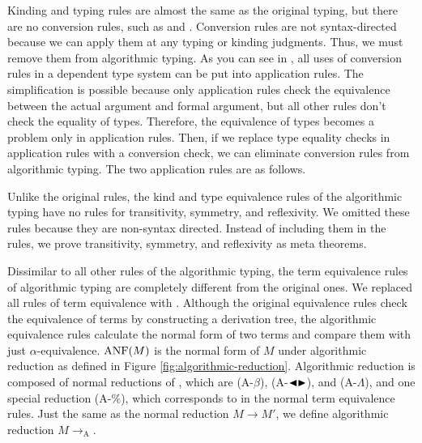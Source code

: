 Kinding and typing rules are almost the same as the original typing, but there
are no conversion rules, such as \TConv and \KConv. Conversion rules are not
syntax-directed because we can apply them at any typing or kinding judgments.
Thus, we must remove them from algorithmic typing.  As you can see in
\cite{benjamin2005attapldependent}, all uses of conversion rules in a dependent type system can be
put into application rules. The simplification is possible because only
application rules check the equivalence between the actual argument and formal
argument, but all other rules don't check the equality of types. Therefore, the
equivalence of types becomes a problem only in application rules. Then, if we
replace type equality checks in application rules with a conversion check, we
can eliminate conversion rules from algorithmic typing. The two application
rules are as follows.

\begin{center}
    {
         \hfil
    }
\end{center}


Unlike the original rules, the kind and type equivalence rules of the
algorithmic typing have no rules for transitivity, symmetry, and reflexivity.
We omitted these rules because they are non-syntax directed. Instead of
including them in the rules, we prove transitivity, symmetry, and reflexivity
as meta theorems.


Dissimilar to all other rules of the algorithmic typing, the term equivalence
rules of algorithmic typing are completely different from the original ones. We
replaced all rules of term equivalence with \QAANF. Although the original
equivalence rules check the equivalence of terms by constructing a derivation
tree, the algorithmic equivalence rules calculate the normal form of two terms
and compare them with just \( \alpha \)-equivalence. \( \text{ANF}(M) \) is the
normal form of \( M \) under algorithmic reduction as defined in Figure
\ref{fig:algorithmic-reduction}. Algorithmic reduction is composed of normal
reductions of \LMD, which are \textsc{(A-$\beta$)}, \textsc{(A-${\mathop{\blacktriangleleft}}{\mathop{\blacktriangleright}}$)}, and
\textsc{(A-$\Lambda$)}, and one special reduction \textsc{(A-$\%$)}, which
corresponds to \QPercent in the normal term equivalence rules. Just the same as
the normal reduction \( M \longrightarrow M' \), we define algorithmic
reduction \( M \longrightarrow_{\text{A}} \).  

